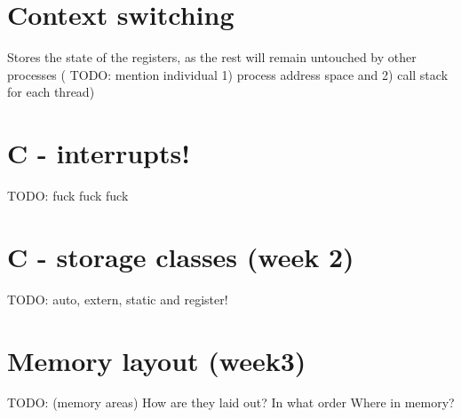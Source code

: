 \documentclass{article}
\begin{document}
\section*{Context switching}
Stores the state of the registers, as the rest will remain untouched by other processes (
TODO: mention individual 1) process address space and 2) call stack for each thread)


\section*{C - interrupts!}
TODO: fuck fuck fuck


\section*{C - storage classes (week 2)}
TODO: auto, extern, static and register!


\section*{Memory layout (week3)}
TODO: (memory areas) How are they laid out? In what order Where in memory?
\end{document}
